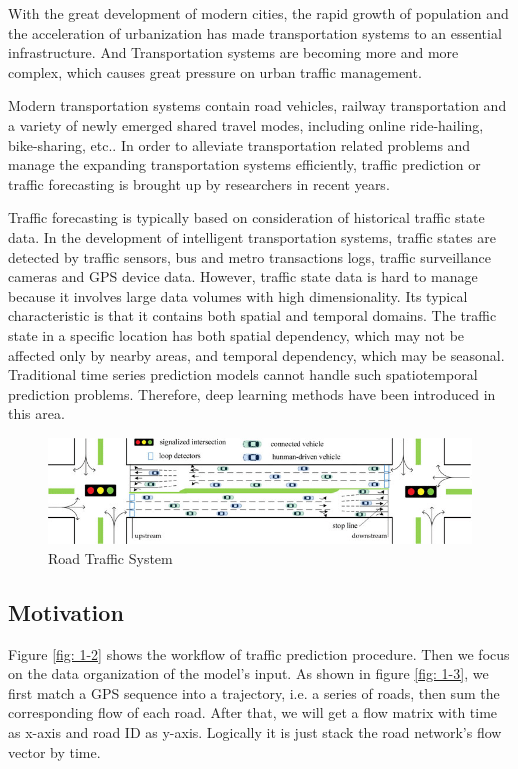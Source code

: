\documentclass[fontset=none]{ctexart}
\theoremstyle{definition}
\theoremstyle{remark}
\begin{document}
With the great development of modern cities, the rapid growth of population and the acceleration of urbanization
has made transportation systems to an essential infrastructure. And Transportation systems are becoming more and more
complex, which causes great pressure on urban traffic management.\cite{yin2021deep}

Modern transportation systems contain road vehicles, railway transportation and a variety of newly emerged
shared travel modes, including online ride-hailing, bike-sharing, etc.. In order to alleviate transportation related
problems and manage the expanding transportation systems efficiently, 
traffic prediction or traffic forecasting is brought up by researchers in recent years.

Traffic forecasting is typically based on consideration of historical traffic state data.
In the development of intelligent transportation systems, traffic states are detected by traffic sensors,
bus and metro transactions logs, traffic surveillance cameras and GPS device data.
However, traffic state data is hard to manage because it involves large data volumes with high dimensionality.
Its typical characteristic is that it contains both spatial and temporal domains.
The traffic state in a specific location has both spatial dependency, which may not
be affected only by nearby areas, and temporal dependency, which may be seasonal.
Traditional time series prediction models cannot handle such spatiotemporal prediction problems.
Therefore, deep learning methods have been introduced in this area.\cite{jiang2021graph}
\begin{figure}[htb]
  \centering
  \includegraphics[width=\textwidth]{images/mid/1-1.png}
  \caption{Road Traffic System\cite{yao2020dynamic}}
  \label{1-1}
\end{figure}

\subsection{Motivation}
Figure \ref{fig: 1-2} shows the workflow of traffic prediction procedure.
Then we focus on the data organization of the model's input.
As shown in figure \ref{fig: 1-3}, we first match a GPS sequence into a trajectory,
i.e. a series of roads, then sum the corresponding flow of each road. 
After that, we will get a flow matrix with time as x-axis and road ID as y-axis.
Logically it is just stack the road network's flow vector by time.
\end{document}
